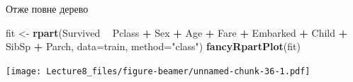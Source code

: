 \documentclass[ignorenonframetext,]{beamer}
\newenvironment{Shaded}{\begin{snugshade}}{\end{snugshade}}
\newcommand{\DataTypeTok}[1]{\textcolor[rgb]{0.13,0.29,0.53}{#1}}
\newcommand{\KeywordTok}[1]{\textcolor[rgb]{0.13,0.29,0.53}{\textbf{#1}}}
\newcommand{\NormalTok}[1]{#1}
\newcommand{\OperatorTok}[1]{\textcolor[rgb]{0.81,0.36,0.00}{\textbf{#1}}}
\newcommand{\StringTok}[1]{\textcolor[rgb]{0.31,0.60,0.02}{#1}}
\begin{document}
\begin{frame}[fragile]{Отже повне дерево}
\protect\hypertarget{ux43eux442ux436ux435-ux43fux43eux432ux43dux435-ux434ux435ux440ux435ux432ux43e}{}

\begin{Shaded}
\begin{Highlighting}[]
\NormalTok{fit <-}\StringTok{ }\KeywordTok{rpart}\NormalTok{(Survived }\OperatorTok{~}\StringTok{ }\NormalTok{Pclass }\OperatorTok{+}\StringTok{ }\NormalTok{Sex }\OperatorTok{+}\StringTok{ }\NormalTok{Age }\OperatorTok{+}\StringTok{ }\NormalTok{Fare }\OperatorTok{+}\StringTok{ }\NormalTok{Embarked }\OperatorTok{+}\StringTok{ }\NormalTok{Child }\OperatorTok{+}\StringTok{ }\NormalTok{SibSp }\OperatorTok{+}\StringTok{ }\NormalTok{Parch,}
               \DataTypeTok{data=}\NormalTok{train,}
               \DataTypeTok{method=}\StringTok{"class"}\NormalTok{)}
\KeywordTok{fancyRpartPlot}\NormalTok{(fit)}
\end{Highlighting}
\end{Shaded}

\texttt{[image: Lecture8\_files/figure-beamer/unnamed-chunk-36-1.pdf]}

\end{frame}
\end{document}

